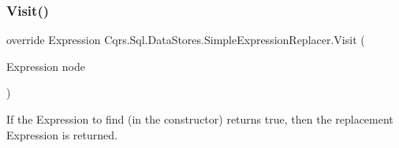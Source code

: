\subsubsection{\texorpdfstring{Visit()}{Visit()}}
{\footnotesize\ttfamily override Expression Cqrs.\+Sql.\+Data\+Stores.\+Simple\+Expression\+Replacer.\+Visit (\begin{DoxyParamCaption}\item[{Expression}]{node }\end{DoxyParamCaption})}



If the Expression to find (in the constructor) returns true, then the replacement Expression is returned. 

